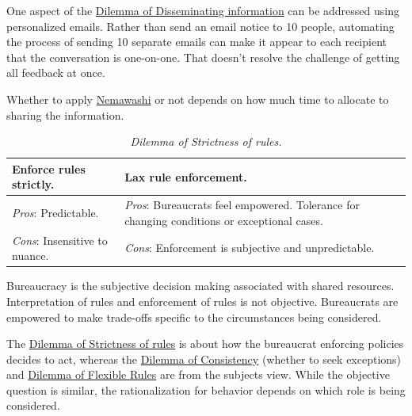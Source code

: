 
One aspect of the \hyperref[table:disseminate-one-by-one]{Dilemma of Disseminating information} can be addressed using personalized emails. Rather than send an email notice to 10 people, automating the process of sending 10 separate emails can make it appear to each recipient that the conversation is one-on-one.  That doesn't resolve the challenge of getting all feedback at once.

Whether to apply \href{https://en.wikipedia.org/wiki/Nemawashi}{Nemawashi} 
or not depends on how much time to allocate to sharing the information. 

\begin{center}
\begin{table}[H] %
\begin{tabular}{ | m{\dilemmatablewidth}| m{\dilemmatablewidth} | } 
  \hline
  \textbf{Enforce rules strictly.} & 
  \textbf{Lax rule enforcement.} \\ 
  \hline
  \textit{Pros}: Predictable. &
  \textit{Pros}: Bureaucrats feel empowered. Tolerance for changing conditions or exceptional cases. \\
  \hline
  \textit{Cons}: Insensitive to nuance. & 
  \textit{Cons}: Enforcement is subjective and unpredictable.  \\  
  \hline
\end{tabular}
\caption{
\textit{Dilemma of Strictness of rules.}
}
\label{table:rule-strictness}
\end{table}
\end{center}

Bureaucracy is the subjective decision making associated with shared resources. Interpretation of rules and enforcement of rules is not objective. Bureaucrats are empowered to make trade-offs specific to the circumstances being considered.


The 
\hyperref[table:rule-strictness]{Dilemma of Strictness of rules} 
is about how the bureaucrat enforcing policies decides to act, whereas the
\hyperref[table:dilemma-consistency]{Dilemma of Consistency} 
(whether to seek exceptions) and
\hyperref[table:dilemma-flexibility]{Dilemma of Flexible Rules}
are from the subjects view. While the objective question is similar, the rationalization for behavior depends on which role is being considered.

